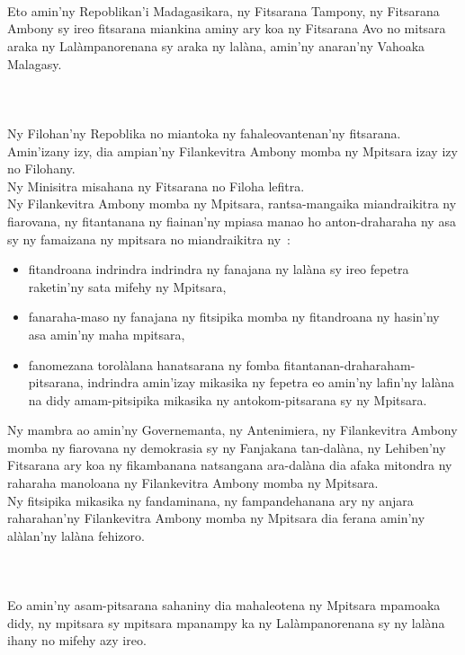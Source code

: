 \documentclass[12pt]{article}
\newcounter{laharana}
\newcommand{\andininy}[0]{
  \paragraph{%
    \NoCaseChange{%
      Andininy~\addtocounter{laharana}{1}\thelaharana.}\label{and:\thelaharana}~%
  }%
}
\begin{document}
\andininy{}Eto amin'ny Repoblikan'i Madagasikara, ny Fitsarana Tampony, ny
Fitsarana Ambony sy ireo fitsarana miankina aminy ary koa ny Fitsarana Avo no
mitsara araka ny Lalàmpanorenana sy araka ny lalàna, amin'ny anaran'ny Vahoaka
Malagasy.

\andininy{}Ny Filohan'ny Repoblika no miantoka ny fahaleovantenan'ny
fitsarana.\\

\noindent
Amin'izany izy, dia ampian'ny Filankevitra Ambony momba ny Mpitsara izay izy no
Filohany.\\

\noindent
Ny Minisitra misahana ny Fitsarana no Filoha lefitra.\\

\noindent
Ny Filankevitra Ambony momba ny Mpitsara, rantsa-mangaika miandraikitra ny
fiarovana, ny fitantanana ny fiainan'ny mpiasa manao ho anton-draharaha ny asa
sy ny famaizana ny mpitsara no miandraikitra ny~:
\begin{itemize}
\item fitandroana indrindra indrindra ny fanajana ny lalàna sy ireo fepetra
  raketin'ny sata mifehy ny Mpitsara,

\item fanaraha-maso ny fanajana ny fitsipika momba ny fitandroana ny hasin'ny
  asa amin'ny maha mpitsara,

\item fanomezana torolàlana hanatsarana ny fomba
  fitantanan-draharaham-pitsarana, indrindra amin'izay mikasika ny fepetra eo
  amin'ny lafin'ny lalàna na didy amam-pitsipika mikasika ny antokom-pitsarana
  sy ny Mpitsara.
\end{itemize}

\noindent
Ny mambra ao amin'ny Governemanta, ny Antenimiera, ny Filankevitra Ambony momba
ny fiarovana ny demokrasia sy ny Fanjakana tan-dalàna, ny Lehiben'ny Fitsarana
ary koa ny fikambanana natsangana ara-dalàna dia afaka mitondra ny raharaha
manoloana ny Filankevitra Ambony momba ny Mpitsara.\\

\noindent
Ny fitsipika mikasika ny fandaminana, ny fampandehanana ary ny anjara
raharahan'ny Filankevitra Ambony momba ny Mpitsara dia ferana amin'ny alàlan'ny
lalàna fehizoro.

\andininy{}Eo amin'ny asam-pitsarana sahaniny dia mahaleotena ny Mpitsara
mpamoaka didy, ny mpitsara sy mpitsara mpanampy ka ny Lalàmpanorenana sy ny
lalàna ihany no mifehy azy ireo.\\
\end{document}
